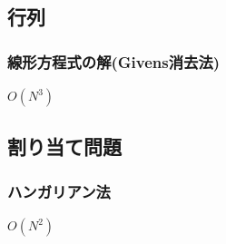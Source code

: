 \subsection{行列}


\subsubsection{線形方程式の解(Givens消去法)}
$O(N^3)$


\subsection{割り当て問題}
\subsubsection{ハンガリアン法}
$O(N^2)$

